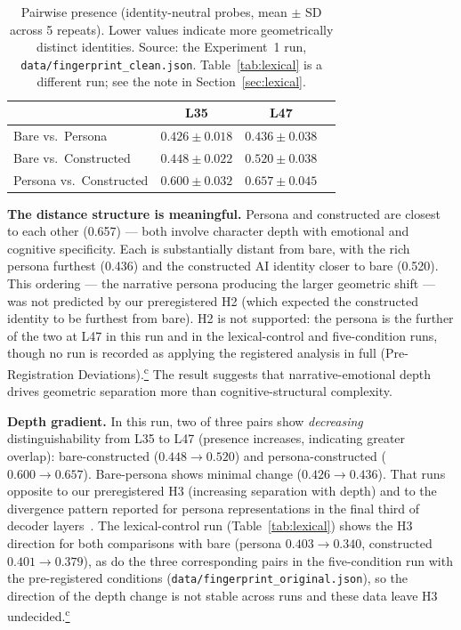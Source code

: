 \documentclass[11pt,a4paper]{article}
\newcommand{\corrmark}{\hyperref[sec:corrections]{\textsuperscript{c}}}
\begin{document}
\begin{table}[H]
\centering
\caption{Pairwise presence (identity-neutral probes, mean $\pm$ SD across
5 repeats). Lower values indicate more geometrically distinct identities.
Source: the Experiment~1 run, \texttt{data/fingerprint\_clean.json}.
Table~\ref{tab:lexical} is a different run; see the note in
Section~\ref{sec:lexical}.}
\label{tab:pairwise}
\begin{tabular}{lccc}
\toprule
& \multicolumn{1}{c}{L35} & \multicolumn{1}{c}{L47} \\
\midrule
Bare vs.\ Persona      & $0.426 \pm 0.018$ & $0.436 \pm 0.038$ \\
Bare vs.\ Constructed   & $0.448 \pm 0.022$ & $0.520 \pm 0.038$ \\
Persona vs.\ Constructed& $0.600 \pm 0.032$ & $0.657 \pm 0.045$ \\
\bottomrule
\end{tabular}
\end{table}

\textbf{The distance structure is meaningful.} Persona and constructed
are closest to each other (0.657) --- both involve character depth with
emotional and cognitive specificity. Each is substantially distant from
bare, with the rich persona furthest (0.436) and the constructed AI
identity closer to bare (0.520). This ordering --- the narrative persona
producing the larger geometric shift --- was not predicted by our
preregistered H2 (which expected the constructed identity to be furthest
from bare). H2 is not supported: the persona is the further of the two at
L47 in this run and in the lexical-control and five-condition runs, though
no run is recorded as applying the registered analysis in full
(Pre-Registration Deviations).\corrmark{} The result suggests that narrative-emotional depth drives
geometric separation more than cognitive-structural complexity.

\textbf{Depth gradient.} In this run, two of three pairs show
\emph{decreasing} distinguishability from L35 to L47 (presence increases,
indicating greater overlap): bare-constructed ($0.448 \to 0.520$) and
persona-constructed ($0.600 \to 0.657$). Bare-persona shows minimal
change ($0.426 \to 0.436$). That runs opposite to our preregistered H3
(increasing separation with depth) and to the divergence pattern reported
for persona representations in the final third of decoder
layers~\citep{cintas2025localizing}. The lexical-control run
(Table~\ref{tab:lexical}) shows the H3 direction for both comparisons with
bare (persona $0.403 \to 0.340$, constructed $0.401 \to 0.379$), as do the
three corresponding pairs in the five-condition run with the pre-registered
conditions (\texttt{data/fingerprint\_original.json}), so the direction of
the depth change is not stable across runs and these data leave H3
undecided.\corrmark
\end{document}

